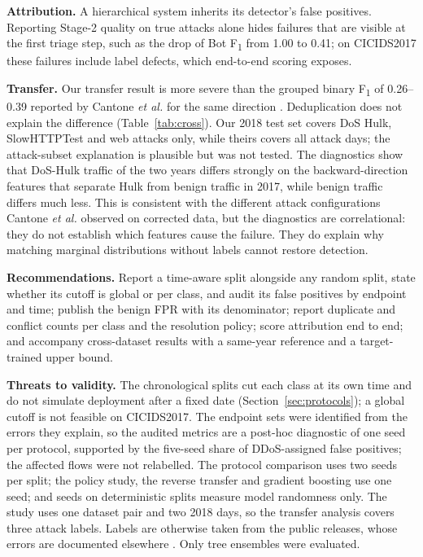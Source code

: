 \documentclass[conference]{IEEEtran}
\newcommand{\Fone}{F\textsubscript{1}}
\begin{document}
\textbf{Attribution.} A hierarchical system inherits its detector's false positives. Reporting Stage-2 quality on true attacks alone hides failures that are visible at the first triage step, such as the drop of Bot \Fone{} from 1.00 to 0.41; on CICIDS2017 these failures include label defects, which end-to-end scoring exposes.

\textbf{Transfer.} Our transfer result is more severe than the grouped binary \Fone{} of 0.26--0.39 reported by Cantone \textit{et al.} for the same direction \cite{cantone2024}. Deduplication does not explain the difference (Table~\ref{tab:cross}). Our 2018 test set covers DoS Hulk, SlowHTTPTest and web attacks only, while theirs covers all attack days; the attack-subset explanation is plausible but was not tested. The diagnostics show that DoS-Hulk traffic of the two years differs strongly on the backward-direction features that separate Hulk from benign traffic in 2017, while benign traffic differs much less. This is consistent with the different attack configurations Cantone \textit{et al.} observed on corrected data, but the diagnostics are correlational: they do not establish which features cause the failure. They do explain why matching marginal distributions without labels cannot restore detection.

\textbf{Recommendations.} Report a time-aware split alongside any random split, state whether its cutoff is global or per class, and audit its false positives by endpoint and time; publish the benign FPR with its denominator; report duplicate and conflict counts per class and the resolution policy; score attribution end to end; and accompany cross-dataset results with a same-year reference and a target-trained upper bound.

\textbf{Threats to validity.} The chronological splits cut each class at its own time and do not simulate deployment after a fixed date (Section~\ref{sec:protocols}); a global cutoff is not feasible on CICIDS2017. The endpoint sets were identified from the errors they explain, so the audited metrics are a post-hoc diagnostic of one seed per protocol, supported by the five-seed share of DDoS-assigned false positives; the affected flows were not relabelled. The protocol comparison uses two seeds per split; the policy study, the reverse transfer and gradient boosting use one seed; and seeds on deterministic splits measure model randomness only. The study uses one dataset pair and two 2018 days, so the transfer analysis covers three attack labels. Labels are otherwise taken from the public releases, whose errors are documented elsewhere \cite{engelen2021,liu2022,lanvin2023}. Only tree ensembles were evaluated.
\end{document}

